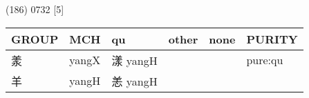 \documentclass[14pt,a4paper]{scrartcl}
\begin{document}
(186) 0732 {[}5{]}

\begin{longtable}[c]{@{}llllll@{}}
\toprule
\begin{minipage}[b]{0.14\columnwidth}\raggedright\strut
GROUP
\strut\end{minipage} &
\begin{minipage}[b]{0.14\columnwidth}\raggedright\strut
MCH
\strut\end{minipage} &
\begin{minipage}[b]{0.14\columnwidth}\raggedright\strut
qu
\strut\end{minipage} &
\begin{minipage}[b]{0.14\columnwidth}\raggedright\strut
other
\strut\end{minipage} &
\begin{minipage}[b]{0.14\columnwidth}\raggedright\strut
none
\strut\end{minipage} &
\begin{minipage}[b]{0.14\columnwidth}\raggedright\strut
PURITY
\strut\end{minipage}\tabularnewline
\midrule
\endhead
\begin{minipage}[t]{0.14\columnwidth}\raggedright\strut
羕
\strut\end{minipage} &
\begin{minipage}[t]{0.14\columnwidth}\raggedright\strut
yangX
\strut\end{minipage} &
\begin{minipage}[t]{0.14\columnwidth}\raggedright\strut
漾 yangH
\strut\end{minipage} &
\begin{minipage}[t]{0.14\columnwidth}\raggedright\strut
\strut\end{minipage} &
\begin{minipage}[t]{0.14\columnwidth}\raggedright\strut
\strut\end{minipage} &
\begin{minipage}[t]{0.14\columnwidth}\raggedright\strut
pure:qu
\strut\end{minipage}\tabularnewline
\begin{minipage}[t]{0.14\columnwidth}\raggedright\strut
羊
\strut\end{minipage} &
\begin{minipage}[t]{0.14\columnwidth}\raggedright\strut
yangH
\strut\end{minipage} &
\begin{minipage}[t]{0.14\columnwidth}\raggedright\strut
恙 yangH
\strut\end{minipage} &

\end{longtable}
\end{document}
